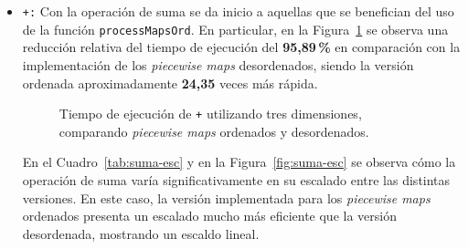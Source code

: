 \begin{itemize}
    \item \texttt{+:} 
    Con la operación de suma se da inicio a aquellas que se benefician del 
    uso de la función \texttt{processMapsOrd}. En particular, en la 
    Figura~\ref{fig:Ren-suma-3d} se observa una reducción relativa del tiempo de 
    ejecución del \textbf{95{,}89\,\%} en comparación con la implementación de los 
    \textit{piecewise maps} desordenados, siendo la versión ordenada aproximadamente 
    \textbf{24,35} veces más rápida.

    \begin{figure}[htbp]
          \centering
          \caption{Tiempo de ejecución de \texttt{+} utilizando tres dimensiones, comparando \textit{piecewise maps} ordenados y desordenados.}
          \label{fig:Ren-suma-3d}
    \end{figure}

    En el Cuadro~\ref{tab:suma-esc} y en la Figura~\ref{fig:suma-esc} 
    se observa cómo la operación de suma varía significativamente en su 
    escalado entre las distintas versiones. En este caso, la versión implementada 
    para los \textit{piecewise maps} ordenados presenta un escalado mucho más 
    eficiente que la versión desordenada, mostrando un escaldo lineal.



\end{itemize}
